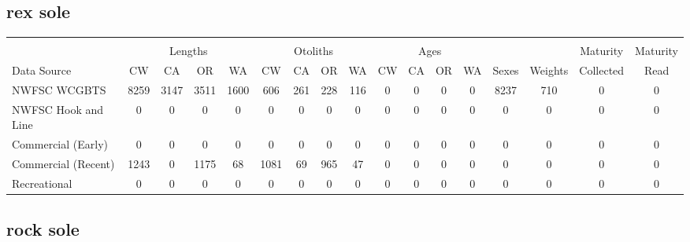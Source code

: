 \documentclass[12pt,]{article}
\begin{document}
\FloatBarrier  

\subsection{rex sole}\label{rex-sole}

\begin{table}[ht]
\centering
\begingroup\fontsize{10pt}{10pt}\selectfont
\begin{tabular}{|l|cccc|cccc|cccc|c|c|c|c|}
  \hline
 &  &  &  &  &  &  &  &  &  &  &  &  &  &  &  &  \\ 
   & \multicolumn{4}{c}{Lengths} &  \multicolumn{4}{c}{Otoliths} & \multicolumn{4}{c}{Ages} &  & & Maturity & Maturity\\
 Data Source & CW & CA & OR & WA & CW & CA & OR & WA & CW & CA & OR & WA & Sexes & Weights & Collected & Read\\
 \hline
NWFSC WCGBTS & 8259 & 3147 & 3511 & 1600 & 606 & 261 & 228 & 116 & 0 & 0 & 0 & 0 & 8237 & 710 & 0 & 0 \\ 
  NWFSC Hook and Line & 0 & 0 & 0 & 0 & 0 & 0 & 0 & 0 & 0 & 0 & 0 & 0 & 0 & 0 & 0 & 0 \\ 
  Commercial (Early) & 0 & 0 & 0 & 0 & 0 & 0 & 0 & 0 & 0 & 0 & 0 & 0 & 0 & 0 & 0 & 0 \\ 
  Commercial (Recent) & 1243 & 0 & 1175 & 68 & 1081 & 69 & 965 & 47 & 0 & 0 & 0 & 0 & 0 & 0 & 0 & 0 \\ 
  Recreational & 0 & 0 & 0 & 0 & 0 & 0 & 0 & 0 & 0 & 0 & 0 & 0 & 0 & 0 & 0 & 0 \\ 
   \hline
\end{tabular}
\endgroup
\end{table}

\FloatBarrier  

\subsection{rock sole}\label{rock-sole}
\end{document}
